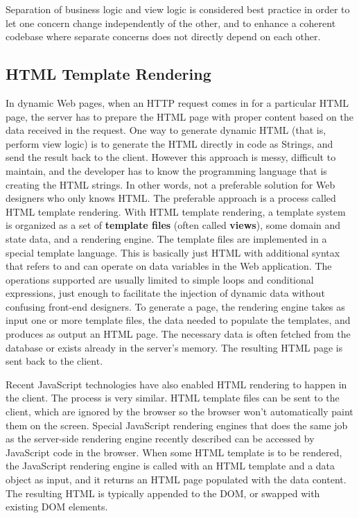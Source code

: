 Separation of business logic and view logic is considered best practice\cite{sepbiz} in order to let one concern change independently of the other, and to enhance a coherent codebase where separate concerns does not directly depend on each other\cite{bestprac}.



\subsection{HTML Template Rendering}
In dynamic Web pages, when an HTTP request comes in for a particular HTML page, the server has to prepare the HTML page with proper content based on the data received in the request. One way to generate dynamic HTML (that is, perform view logic) is to generate the HTML directly in code as Strings, and send the result back to the client. However this approach is messy, difficult to maintain, and the developer has to know the programming language that is creating the HTML strings. In other words, not a preferable solution for Web designers who only knows HTML. The preferable approach is a process called HTML template rendering. With HTML template rendering, a template system is organized as a set of \textbf{template files} (often called \textbf{views}), some domain and state data, and a rendering engine. The template files are implemented in a special template language. This is basically just HTML with additional syntax that refers to and can operate on data variables in the Web application. The operations supported are usually limited to simple loops and conditional expressions, just enough to facilitate the injection of dynamic data without confusing front-end designers. To generate a page, the rendering engine takes as input one or more template files, the data needed to populate the templates, and produces as output an HTML page. The necessary data is often fetched from the database or exists already in the server's memory. The resulting HTML page is sent back to the client. 

Recent JavaScript technologies have also enabled HTML rendering to happen in the client. The process is very similar. HTML template files can be sent to the client, which are ignored by the browser so the browser won't automatically paint them on the screen. Special JavaScript rendering engines that does the same job as the server-side rendering engine recently described can be accessed by JavaScript code in the browser. When some HTML template is to be rendered, the JavaScript rendering engine is called with an HTML template and a data object as input, and it returns an HTML page populated with the data content. The resulting HTML is typically appended to the DOM, or swapped with existing DOM elements. 

